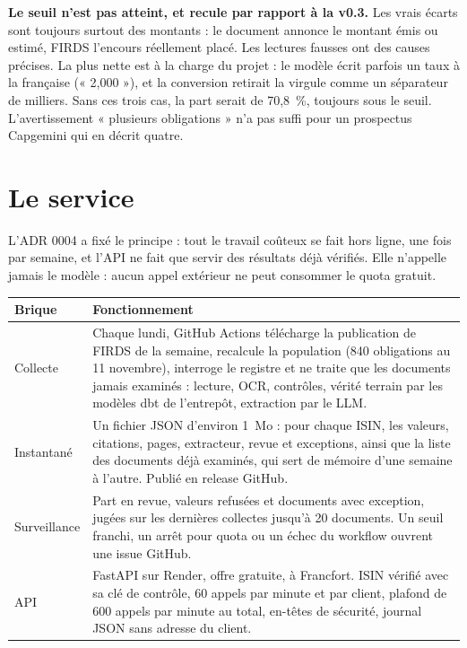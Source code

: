 \documentclass[11pt,a4paper]{article}
\begin{document}
\textbf{Le seuil n'est pas atteint, et recule par rapport à la v0.3.} Les vrais écarts sont toujours surtout des montants : le document annonce le montant émis ou estimé, FIRDS l'encours réellement placé. Les lectures fausses ont des causes précises. La plus nette est à la charge du projet : le modèle écrit parfois un taux à la française (« 2,000 »), et la conversion retirait la virgule comme un séparateur de milliers. Sans ces trois cas, la part serait de 70,8~\%, toujours sous le seuil. L'avertissement « plusieurs obligations » n'a pas suffi pour un prospectus Capgemini qui en décrit quatre.


\section{Le service}

L'ADR 0004 a fixé le principe : tout le travail coûteux se fait hors ligne, une fois par semaine, et l'API ne fait que servir des résultats déjà vérifiés. Elle n'appelle jamais le modèle : aucun appel extérieur ne peut consommer le quota gratuit.

\begin{table}[H]
\small
\begin{tabularx}{\linewidth}{lY}
\toprule
\textbf{Brique} & \textbf{Fonctionnement} \\
\midrule
Collecte & Chaque lundi, GitHub Actions télécharge la publication de FIRDS de la semaine, recalcule la population (840 obligations au 11 novembre), interroge le registre et ne traite que les documents jamais examinés : lecture, OCR, contrôles, vérité terrain par les modèles dbt de l'entrepôt, extraction par le LLM. \\
Instantané & Un fichier JSON d'environ 1~Mo : pour chaque ISIN, les valeurs, citations, pages, extracteur, revue et exceptions, ainsi que la liste des documents déjà examinés, qui sert de mémoire d'une semaine à l'autre. Publié en release GitHub. \\
Surveillance & Part en revue, valeurs refusées et documents avec exception, jugées sur les dernières collectes jusqu'à 20 documents. Un seuil franchi, un arrêt pour quota ou un échec du workflow ouvrent une issue GitHub. \\
API & FastAPI sur Render, offre gratuite, à Francfort. ISIN vérifié avec sa clé de contrôle, 60 appels par minute et par client, plafond de 600 appels par minute au total, en-têtes de sécurité, journal JSON sans adresse du client. \\
\bottomrule
\end{tabularx}
\end{table}
\end{document}
